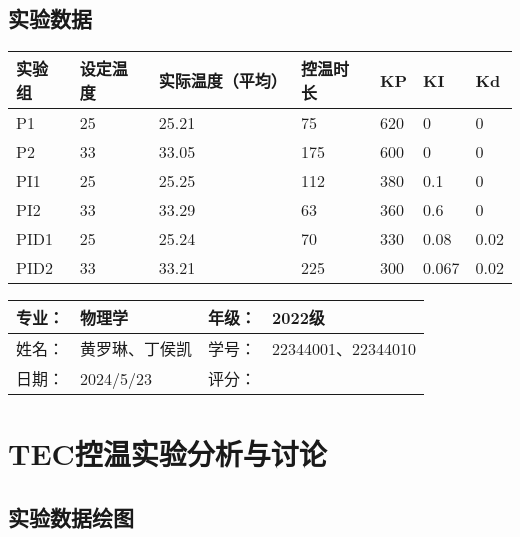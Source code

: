 \documentclass[dvipsnames, svgnames,a4paper,11pt]{article}
\begin{document}
	\subsection{实验数据}
	\begin{table}[!ht]
		\centering
		\begin{tabular}{|l|l|l|l|l|l|l|}
		\hline
			实验组 & 设定温度 & 实际温度（平均） & 控温时长 & KP & KI & Kd \\ \hline
			P1 & 25 & 25.21 & 75 & 620 & 0 & 0 \\ \hline
			P2 & 33 & 33.05 & 175 & 600 & 0 & 0 \\ \hline
			PI1 & 25 & 25.25 & 112 & 380 & 0.1 & 0 \\ \hline
			PI2 & 33 & 33.29 & 63 & 360 & 0.6 & 0 \\ \hline
			PID1 & 25 & 25.24 & 70 & 330 & 0.08 & 0.02 \\ \hline
			PID2 & 33 & 33.21 & 225 & 300 & 0.067 & 0.02 \\ \hline
		\end{tabular}
	\end{table}
	
	
	
	\clearpage
	
	\begin{table}
		\renewcommand\arraystretch{1.7}
		\begin{tabularx}{\textwidth}{|X|X|X|X|}
			\hline
			专业：& 物理学 &年级：& 2022级\\
			\hline
			姓名： &  黄罗琳、丁侯凯& 学号：&22344001、22344010 \\
			\hline
			日期：&  2024/5/23& 评分： &\\
			\hline
		\end{tabularx}
	\end{table}
	
	\section{TEC控温实验\quad\heiti 分析与讨论}
	
	\subsection{实验数据绘图}
\end{document}

